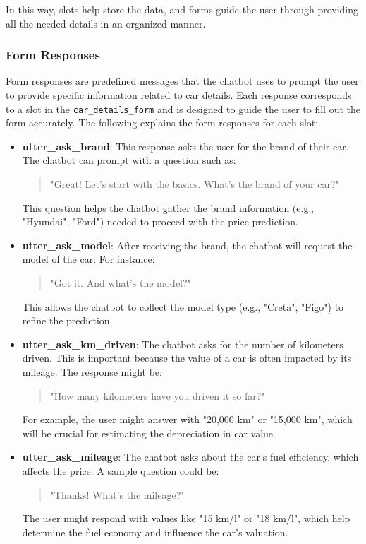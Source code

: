 \documentclass[a4paper,12pt]{article}
\begin{document}
In this way, slots help store the data, and forms guide the user through providing all the needed details in an organized manner.

\subsubsection{Form Responses}

Form responses are predefined messages that the chatbot uses to prompt the user to provide specific information related to car details. Each response corresponds to a slot in the \texttt{car\_details\_form} and is designed to guide the user to fill out the form accurately. The following explains the form responses for each slot:

\begin{itemize}
	\item \textbf{utter\_ask\_brand}: This response asks the user for the brand of their car. The chatbot can prompt with a question such as:
	\begin{quote}
		"Great! Let's start with the basics. What’s the brand of your car?"
	\end{quote}
	This question helps the chatbot gather the brand information (e.g., "Hyundai", "Ford") needed to proceed with the price prediction.
	
	\item \textbf{utter\_ask\_model}: After receiving the brand, the chatbot will request the model of the car. For instance:
	\begin{quote}
		"Got it. And what’s the model?"
	\end{quote}
	This allows the chatbot to collect the model type (e.g., "Creta", "Figo") to refine the prediction.
	
	\item \textbf{utter\_ask\_km\_driven}: The chatbot asks for the number of kilometers driven. This is important because the value of a car is often impacted by its mileage. The response might be:
	\begin{quote}
		"How many kilometers have you driven it so far?"
	\end{quote}
	For example, the user might answer with "20,000 km" or "15,000 km", which will be crucial for estimating the depreciation in car value.
	
	\item \textbf{utter\_ask\_mileage}: The chatbot asks about the car's fuel efficiency, which affects the price. A sample question could be:
	\begin{quote}
		"Thanks! What’s the mileage?"
	\end{quote}
	The user might respond with values like "15 km/l" or "18 km/l", which help determine the fuel economy and influence the car’s valuation.
	

\end{itemize}
\end{document}

